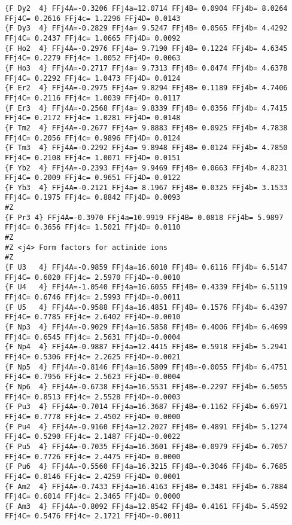 {\begin{verbatim}
{F Dy2  4} FFj4A=-0.3206 FFj4a=12.0714 FFj4B= 0.0904 FFj4b= 8.0264 FFj4C= 0.2616 FFj4c= 1.2296 FFj4D= 0.0143 
{F Dy3  4} FFj4A=-0.2829 FFj4a= 9.5247 FFj4B= 0.0565 FFj4b= 4.4292 FFj4C= 0.2437 FFj4c= 1.0665 FFj4D= 0.0092 
{F Ho2  4} FFj4A=-0.2976 FFj4a= 9.7190 FFj4B= 0.1224 FFj4b= 4.6345 FFj4C= 0.2279 FFj4c= 1.0052 FFj4D= 0.0063 
{F Ho3  4} FFj4A=-0.2717 FFj4a= 9.7313 FFj4B= 0.0474 FFj4b= 4.6378 FFj4C= 0.2292 FFj4c= 1.0473 FFj4D= 0.0124 
{F Er2  4} FFj4A=-0.2975 FFj4a= 9.8294 FFj4B= 0.1189 FFj4b= 4.7406 FFj4C= 0.2116 FFj4c= 1.0039 FFj4D= 0.0117 
{F Er3  4} FFj4A=-0.2568 FFj4a= 9.8339 FFj4B= 0.0356 FFj4b= 4.7415 FFj4C= 0.2172 FFj4c= 1.0281 FFj4D= 0.0148 
{F Tm2  4} FFj4A=-0.2677 FFj4a= 9.8883 FFj4B= 0.0925 FFj4b= 4.7838 FFj4C= 0.2056 FFj4c= 0.9896 FFj4D= 0.0124 
{F Tm3  4} FFj4A=-0.2292 FFj4a= 9.8948 FFj4B= 0.0124 FFj4b= 4.7850 FFj4C= 0.2108 FFj4c= 1.0071 FFj4D= 0.0151 
{F Yb2  4} FFj4A=-0.2393 FFj4a= 9.9469 FFj4B= 0.0663 FFj4b= 4.8231 FFj4C= 0.2009 FFj4c= 0.9651 FFj4D= 0.0122 
{F Yb3  4} FFj4A=-0.2121 FFj4a= 8.1967 FFj4B= 0.0325 FFj4b= 3.1533 FFj4C= 0.1975 FFj4c= 0.8842 FFj4D= 0.0093 
#Z
{F Pr3 4} FFj4A=-0.3970 FFj4a=10.9919 FFj4B= 0.0818 FFj4b= 5.9897 FFj4C= 0.3656 FFj4c= 1.5021 FFj4D= 0.0110 
#Z
#Z <j4> Form factors for actinide ions
#Z
{F U3   4} FFj4A=-0.9859 FFj4a=16.6010 FFj4B= 0.6116 FFj4b= 6.5147 FFj4C= 0.6020 FFj4c= 2.5970 FFj4D=-0.0010 
{F U4   4} FFj4A=-1.0540 FFj4a=16.6055 FFj4B= 0.4339 FFj4b= 6.5119 FFj4C= 0.6746 FFj4c= 2.5993 FFj4D=-0.0011 
{F U5   4} FFj4A=-0.9588 FFj4a=16.4851 FFj4B= 0.1576 FFj4b= 6.4397 FFj4C= 0.7785 FFj4c= 2.6402 FFj4D=-0.0010 
{F Np3  4} FFj4A=-0.9029 FFj4a=16.5858 FFj4B= 0.4006 FFj4b= 6.4699 FFj4C= 0.6545 FFj4c= 2.5631 FFj4D=-0.0004 
{F Np4  4} FFj4A=-0.9887 FFj4a=12.4415 FFj4B= 0.5918 FFj4b= 5.2941 FFj4C= 0.5306 FFj4c= 2.2625 FFj4D=-0.0021 
{F Np5  4} FFj4A=-0.8146 FFj4a=16.5809 FFj4B=-0.0055 FFj4b= 6.4751 FFj4C= 0.7956 FFj4c= 2.5623 FFj4D=-0.0004 
{F Np6  4} FFj4A=-0.6738 FFj4a=16.5531 FFj4B=-0.2297 FFj4b= 6.5055 FFj4C= 0.8513 FFj4c= 2.5528 FFj4D=-0.0003 
{F Pu3  4} FFj4A=-0.7014 FFj4a=16.3687 FFj4B=-0.1162 FFj4b= 6.6971 FFj4C= 0.7778 FFj4c= 2.4502 FFj4D= 0.0000 
{F Pu4  4} FFj4A=-0.9160 FFj4a=12.2027 FFj4B= 0.4891 FFj4b= 5.1274 FFj4C= 0.5290 FFj4c= 2.1487 FFj4D=-0.0022 
{F Pu5  4} FFj4A=-0.7035 FFj4a=16.3601 FFj4B=-0.0979 FFj4b= 6.7057 FFj4C= 0.7726 FFj4c= 2.4475 FFj4D= 0.0000 
{F Pu6  4} FFj4A=-0.5560 FFj4a=16.3215 FFj4B=-0.3046 FFj4b= 6.7685 FFj4C= 0.8146 FFj4c= 2.4259 FFj4D= 0.0001 
{F Am2  4} FFj4A=-0.7433 FFj4a=16.4163 FFj4B= 0.3481 FFj4b= 6.7884 FFj4C= 0.6014 FFj4c= 2.3465 FFj4D= 0.0000 
{F Am3  4} FFj4A=-0.8092 FFj4a=12.8542 FFj4B= 0.4161 FFj4b= 5.4592 FFj4C= 0.5476 FFj4c= 2.1721 FFj4D=-0.0011 

\end{verbatim}}
